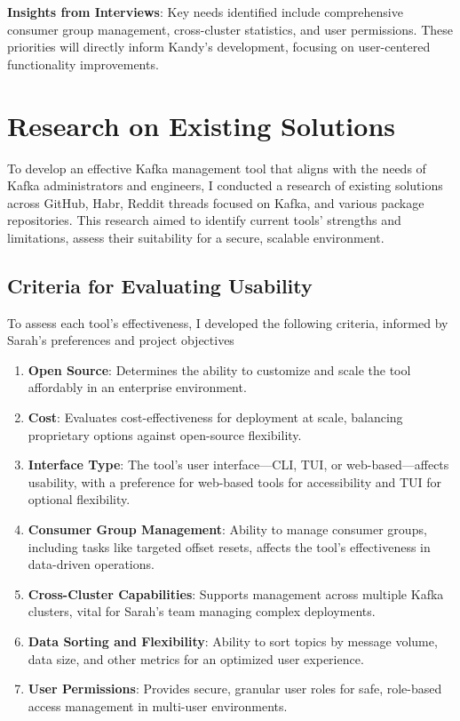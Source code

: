 \documentclass[10pt , a4paper]{report}
\begin{document}
\textbf{Insights from Interviews}: Key needs identified include comprehensive consumer group management, cross-cluster statistics, and user permissions. These priorities will directly inform Kandy’s development, focusing on user-centered functionality improvements.

\section{Research on Existing Solutions}

To develop an effective Kafka management tool that aligns with the needs of Kafka administrators and engineers, I conducted a research of existing solutions across GitHub, Habr, Reddit threads focused on Kafka, and various package repositories. This research aimed to identify current tools’ strengths and limitations, assess their suitability for a secure, scalable environment.

\subsection{Criteria for Evaluating Usability}
To assess each tool's effectiveness, I developed the following criteria, informed by Sarah’s preferences and project objectives

\begin{enumerate}
    \item \textbf{Open Source}: Determines the ability to customize and scale the tool affordably in an enterprise environment.
    \item \textbf{Cost}: Evaluates cost-effectiveness for deployment at scale, balancing proprietary options against open-source flexibility.
    \item \textbf{Interface Type}: The tool’s user interface—CLI, TUI, or web-based—affects usability, with a preference for web-based tools for accessibility and TUI for optional flexibility.
    \item \textbf{Consumer Group Management}: Ability to manage consumer groups, including tasks like targeted offset resets, affects the tool's effectiveness in data-driven operations.
    \item \textbf{Cross-Cluster Capabilities}: Supports management across multiple Kafka clusters, vital for Sarah’s team managing complex deployments.
    \item \textbf{Data Sorting and Flexibility}: Ability to sort topics by message volume, data size, and other metrics for an optimized user experience.
    \item \textbf{User Permissions}: Provides secure, granular user roles for safe, role-based access management in multi-user environments.
\end{enumerate}
\end{document}
